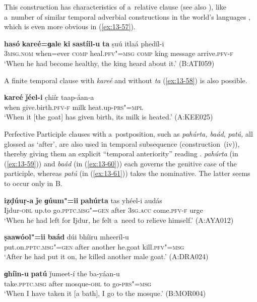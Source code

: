 This construction has characteristics of a~relative clause (see also ), like a~number of similar temporal adverbial constructions in the world's languages \citep[246--247]{thompsonetal2007}, which is even more obvious in (\ref{ex:13-57}).

\begin{exe}
\ex
\label{ex:13-57}
\gll \textbf{hasó} \textbf{kareé=ɡale} \textbf{ki} \textbf{sastíil-u} \textbf{ta} ṣuú itlaá phedíl-i \\
\textsc{3msg.nom} when=ever \textsc{comp} heal.\textsc{pfv"=msg} \textsc{comp} king message arrive.\textsc{pfv-f} \\
\glt `When he had become healthy, the king heard about it.' (B:ATI059) 
\end{exe}

A finite temporal clause with \textit{kareé} and without \textit{ta} (\ref{ex:13-58}) is also possible.

\begin{exe}
\ex
\label{ex:13-58}
\gll \textbf{kareé} \textbf{ǰéel-i} c̣hiír taap-áan-a \\
when give.birth.\textsc{pfv-f} milk heat.up-\textsc{prs"=mpl} \\
\glt `When it [the goat] has given birth, its milk is heated.' (A:KEE025) 
\end{exe}

Perfective Participle clauses with a~postposition, such as \textit{pahúrta, baád}, \textit{patú,} all glossed as `after', are also used in temporal subsequence (construction~(iv)), thereby giving them an explicit ``temporal anteriority'' reading \citep[159]{cristofaro2005}. \textit{pahúrta} (in (\ref{ex:13-59})) and \textit{baád} (in (\ref{ex:13-60})) each governs the genitive case of the participle, whereas \textit{patú} (in (\ref{ex:13-61})) takes the nominative. The latter seems to occur only in B. 

\begin{exe}
\ex
\label{ex:13-59}
\gll \textbf{iẓḍúuṛ-a} \textbf{ǰe} \textbf{ɡúum"=ii} \textbf{pahúrta} tas yhéel-i audás \\
Ijdur-\textsc{obl} up.to go.\textsc{pptc.msg"=gen} after \textsc{3sg.acc} come.\textsc{pfv-f} urge \\
\glt `When he had left for Ijdur, he felt a~need to relieve himself.' (A:AYA012)

\ex
\label{ex:13-60}
\gll \textbf{ṣaawóol"=ii} \textbf{baád} dúi bhíiru mheeríl-u \\
put.on.\textsc{pptc.msg"=gen} after another he.goat kill.\textsc{pfv"=msg}  \\
\glt `After he had put it on, he killed another male goat.' (A:DRA024)

\ex
\label{ex:13-61}
\gll \textbf{ɡhíin-u} \textbf{patú} ǰumeet-í the ba-yáan-u  \\
take.\textsc{pptc.msg} after mosque-\textsc{obl} to go-\textsc{prs"=msg} \\
\glt `When I have taken it [a bath], I go to the mosque.' (B:MOR004) 
\end{exe}

